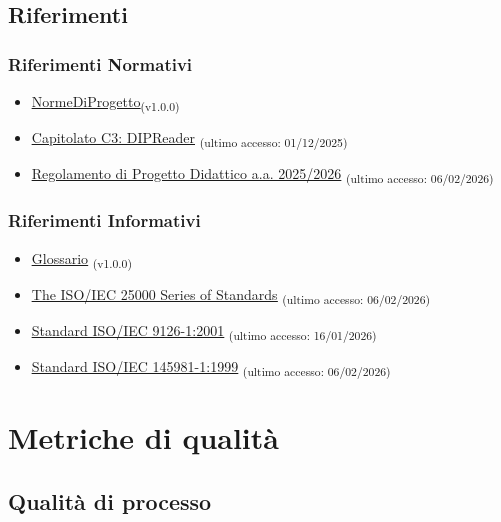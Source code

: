 \documentclass[a4paper,12pt]{article}
\newcommand{\ped}[1]{\textsubscript{#1}}
\begin{document}
\subsection{Riferimenti}

\subsubsection{Riferimenti Normativi}
\begin{itemize}
    \item \href{https://7-zpus.github.io/Docs/assets/2_RTB/DocumentiInterni/NormeDiProgetto.pdf}{\ul{NormeDiProgetto}}\ped{(v1.0.0)}
    \item \href{https://www.math.unipd.it/~tullio/IS-1/2025/Progetto/C3.pdf}{\ul{Capitolato C3: DIPReader}} \ped{(ultimo accesso: 01/12/2025)}
    \item \href{https://www.math.unipd.it/~tullio/IS-1/2025/Dispense/PD1.pdf}{\ul{Regolamento di Progetto Didattico a.a. 2025/2026}} \ped{(ultimo accesso: 06/02/2026)}
\end{itemize}
\subsubsection{Riferimenti Informativi}
\begin{itemize}
    \item \href{https://7-zpus.github.io/Docs/assets/2_RTB/DocumentiInterni/Glossario.pdf}{\ul{Glossario}} \ped{(v1.0.0)}
    \item \href{https://iso25000.com}{\ul{The ISO/IEC 25000 Series of Standards}} \ped{(ultimo accesso: 06/02/2026)}
    \item \href{https://www.iso.org/standard/63712.html}{\ul{Standard ISO/IEC 9126-1:2001}} \ped{(ultimo accesso: 16/01/2026)}
    \item \href{https://www.iso.org/standard/71952.html}{\ul{Standard ISO/IEC 145981-1:1999}} \ped{(ultimo accesso: 06/02/2026)}
\end{itemize}

\section{Metriche di qualità}

\subsection{Qualità di processo}
\end{document}
